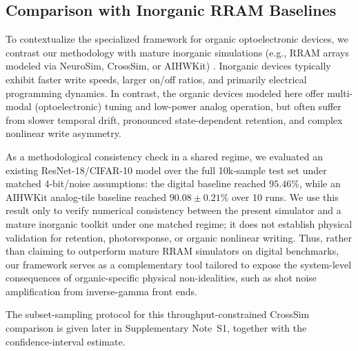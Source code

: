 \subsection{Comparison with Inorganic RRAM Baselines}
\label{subsec:inorganic-comparison}

To contextualize the specialized framework for organic optoelectronic devices, we contrast our methodology with mature inorganic simulations (e.g., RRAM arrays modeled via NeuroSim, CrossSim, or AIHWKit) \citep{peng2020dnnneurosim,crosssim2024,rasch2021aihwkit}. Inorganic devices typically exhibit faster write speeds, larger on/off ratios, and primarily electrical programming dynamics. In contrast, the organic devices modeled here offer multi-modal (optoelectronic) tuning and low-power analog operation, but often suffer from slower temporal drift, pronounced state-dependent retention, and complex nonlinear write asymmetry.

As a methodological consistency check in a shared regime, we evaluated an existing ResNet-18/CIFAR-10 model over the full 10k-sample test set under matched 4-bit/noise assumptions: the digital baseline reached \(95.46\%\), while an AIHWKit analog-tile baseline reached \(90.08\pm0.21\%\) over 10 runs. We use this result only to verify numerical consistency between the present simulator and a mature inorganic toolkit under one matched regime; it does not establish physical validation for retention, photoresponse, or organic nonlinear writing. Thus, rather than claiming to outperform mature RRAM simulators on digital benchmarks, our framework serves as a complementary tool tailored to expose the system-level consequences of organic-specific physical non-idealities, such as shot noise amplification from inverse-gamma front ends.

The subset-sampling protocol for this throughput-constrained CrossSim comparison
is given later in Supplementary Note~S1, together with the confidence-interval
estimate.


